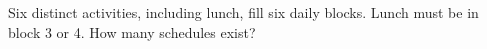 Six distinct activities, including lunch, fill six daily blocks. Lunch must be in block 3 or 4. How many schedules exist?
